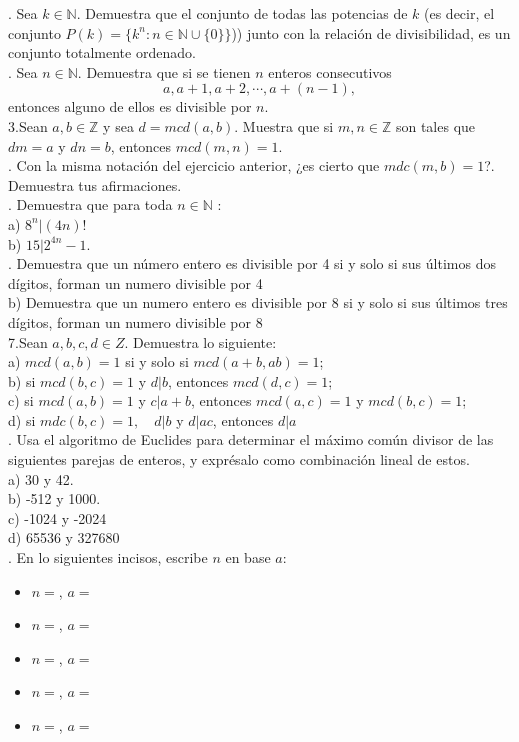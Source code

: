 \documentclass[letterpaper]{article}
\newcommand{\N}{\mathds{N}}
\newcommand{\Z}{\mathds{Z}}
\renewcommand{\*}{\cdot}
\theoremstyle{definition}
\begin{document}
. Sea $ k \in \N $. Demuestra que el conjunto de todas las potencias de $ k $ (es decir, el conjunto $ P(k) = \{ k^n : n \in \N \cup \{ 0\} \} $)) junto con la relación de divisibilidad, es un conjunto totalmente ordenado.\\

. Sea $ n \in \N $. Demuestra que si se tienen $ n $ enteros consecutivos \[ a, a+1, a+2, \cdots, a + (n -1),  \] entonces alguno de ellos es divisible por $ n $.\\

\noindent3.Sean $ a,b \in \Z $ y sea $ d = mcd(a,b) $. Muestra que si $ m,n \in \Z$ son tales que $ dm = a $  y $ dn = b $, entonces $ mcd(m,n) = 1 $.\\

. Con la misma notación del ejercicio anterior, ¿es cierto que $ mdc(m,b) = 1 $?. Demuestra tus afirmaciones.\\

. Demuestra  que para toda $ n \in \N $ :\\
a) $ 8^n | (4n)! $\\
b) $ 15 | 2^{4n}-1 $.\\

. Demuestra que un número entero es divisible por 4 si y solo si sus últimos dos dígitos, forman un numero divisible por 4\\
b) Demuestra que un numero entero es divisible por 8 si y solo si sus últimos tres dígitos, forman un numero divisible por 8\\

\noindent7.Sean $ a,b,c,d \in Z $. Demuestra lo siguiente:\\
a) $ mcd(a,b) = 1 $ si y solo si $ mcd(a+b,ab) = 1 $;\\
b) si $ mcd(b,c) = 1 $ y $ d|b $, entonces $ mcd(d,c) = 1 $;\\
c) si $ mcd(a,b) = 1 $ y $ c|a+b $, entonces $ mcd(a,c) = 1 $ y $ mcd(b,c) = 1 $;\\
d) si $ mdc(b,c) = 1, \quad d|b $ y $ d|ac $, entonces $ d|a $\\

. Usa el algoritmo de Euclides para determinar el máximo común divisor de las siguientes parejas de enteros, y exprésalo como combinación lineal de estos.\\
a) 30 y 42.\\
b) -512 y 1000.\\
c) -1024 y -2024\\
d) 65536 y 327680\\

. En lo siguientes incisos, escribe $ n $ en base $ a $:\\
\begin{itemize}
	\item $ n = $, $ a = $
	\item $ n = $, $ a = $
	\item $ n = $, $ a = $
	\item $ n = $, $ a = $
	\item $ n = $, $ a = $
\end{itemize}
\end{document}
